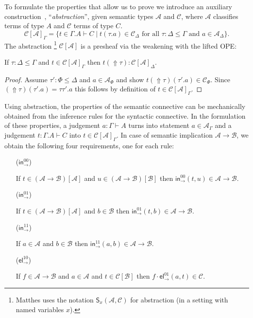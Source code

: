 \documentclass[a4paper,USenglish,cleveref, autoref, thm-restate]{lipics-v2019}
\makeatletter
\def\namedlabel#1#2{\begingroup
    #2%
    \def\@currentlabel{#2}%
    \phantomsection\label{#1}\endgroup
}
\newcommand{\tin}{\ensuremath{\mathsf{in}}}
\newcommand{\inn}[2]{\ensuremath{\tin_{#1}^{#2}}}
\newcommand{\tel}{\mathsf{el}}
\newcommand{\el}[2]{\ensuremath{\tel_{#1}^{#2}}}
\newcommand{\A}{\mathcal{A}}
\newcommand{\B}{\mathcal{B}}
\newcommand{\C}{\mathcal{C}}
\newcommand{\Up}{\mathop{\Uparrow}}
\makeatother
\begin{document}
To formulate the properties that allow us to prove  we
introduce an auxiliary construction \fbox{$\C[\A]$}\,, ``\emph{abstraction}'',
given semantic types $\A$ and $\C$, where $\A$ classifies terms of
type $A$ and $\C$ terms of type $C$.
\[
  \C[\A]_\Gamma =
  \{ t \in \Gamma.A \vdash C
     \mid t(\tau.a) \in \C_\Delta
     \mbox{ for all } \tau : \Delta \leq \Gamma
     \mbox{ and } a \in \A_\Delta
  \}
  .
\]
The abstraction%
\footnote{Matthes \cite[Sec.~6.2]{matthes:intersection} uses the
  notation $\mathsf{S}_x(\A,\C)$ for abstraction (in a setting with
  named variables $x$).}
$\C[\A]$ is a presheaf via the weakening with the
lifted OPE:
\begin{lemma}
  If $\tau : \Delta \leq \Gamma$ and $t \in \C[\A]_\Gamma$ then
  $t(\Up\tau) : \C[\A]_\Delta$.
\end{lemma}
\begin{proof}
  Assume $\tau' : \Phi \leq \Delta$ and $a \in \A_\Phi$ and show
  $t(\Up\tau)(\tau'.a) \in \C_\Phi$.  Since $(\Up\tau)(\tau'.a) =
  \tau\tau'.a$ this follows by definition of $t \in \C[\A]_\Gamma$.
\end{proof}

Using abstraction, the properties of the semantic connective can be
mechanically obtained from the inference rules for the syntactic
connective.  In the formulation of these properties, a judgement $a :
\Gamma \vdash A$ turns into statement $a \in \A_\Gamma$ and a
judgement $t : \Gamma.A \vdash C$ into $t \in \C[\A]_\Gamma$.
In case of semantic implication $\A \to \B$, we obtain the following
four requirements, one for each rule:
\begin{itemize}%
\setlength{\itemindent}{2.7em}

\item[\namedlabel{it:in00}{\rm(\inn\to{00})}]
  If $t \in (\A \to \B)[\A]$ and $u \in (\A \to \B)[\B]$ then
  $\inn\to{00}(t,u) \in \A \to \B$.

\item[\namedlabel{it:in01}{\rm(\inn\to{01})}]
  If $t \in (\A \to \B)[\A]$ and $b \in \B$ then
  $\inn\to{01}(t,b) \in \A \to \B$.

\item[\namedlabel{it:in11}{\rm(\inn\to{11})}]
  If $a \in \A$ and $b \in \B$ then $\inn\to{11}(a,b) \in \A \to \B$.

\item[\namedlabel{it:el10}{\rm(\el\to{10})}]
  If $f \in \A \to \B$ and $a \in \A$ and $t \in \C[\B]$ then
  $f \cdot \el\to{01}(a,t) \in \C$.

\end{itemize}
\end{document}
